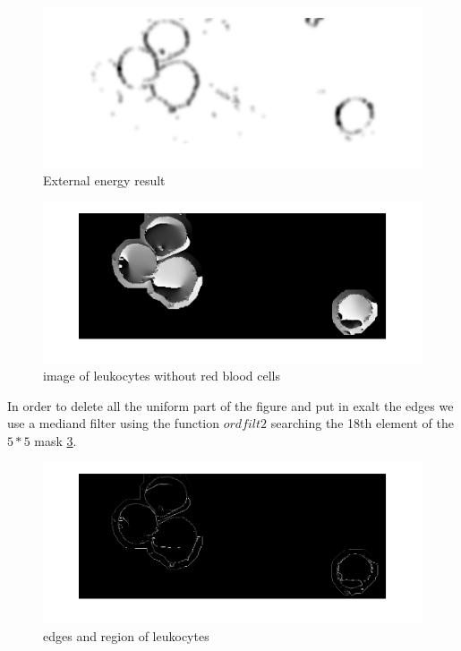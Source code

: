 \begin{figure}
	\begin{center}
		\centering
		\includegraphics[scale=0.5]{img/Eext.png}
		\caption{External energy result}
		\label{fig:Eextforce}
	\end{center}
\end{figure}
\begin{figure}
	\begin{center}
		\centering
		\includegraphics[scale=0.5]{img/onlyleuco.png}
		\caption{image of leukocytes without red blood cells}
		\label{fig:onlyleu}
	\end{center}
\end{figure}
\bigskip

In order to delete all the uniform part of the figure and put in exalt the edges we use a mediand filter using the function $ordfilt2$ searching the 18th element of the $5 * 5$ mask \ref{fig:Pmedonlyleu}.

\begin{figure}
	\begin{center}
		\centering
		\includegraphics[scale=0.5]{img/Pmedonlyleuko.png}
		\caption{edges and region of leukocytes}
		\label{fig:Pmedonlyleu}
	\end{center}
\end{figure}
